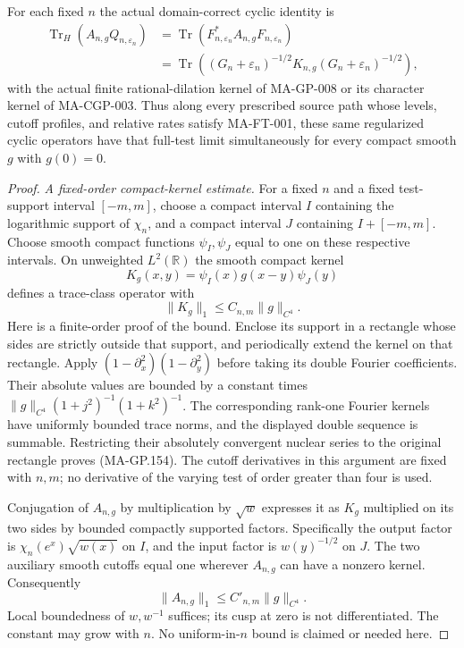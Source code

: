For each fixed $n$ the actual domain-correct cyclic identity is
\[
 \begin{split}
 \operatorname{Tr}_H(A_{n,g}Q_{n,\varepsilon_n})
 &=\operatorname{Tr}
       (F_{n,\varepsilon_n}^*A_{n,g}F_{n,\varepsilon_n})\\
 &=\operatorname{Tr}
       \left((G_n+\varepsilon_n)^{-1/2}
              K_{n,g}(G_n+\varepsilon_n)^{-1/2}\right),
 \end{split}
 \tag{MA-GP.152}
\]
with the actual finite rational-dilation kernel of MA-GP-008
or its character kernel of MA-CGP-003.  Thus along every
prescribed source path whose levels, cutoff profiles, and relative
rates satisfy MA-FT-001, these same regularized cyclic
operators have that full-test limit simultaneously
for every compact smooth $g$ with $g(0)=0$.

\begin{proof}
\emph{A fixed-order compact-kernel estimate.}
For a fixed $n$ and a fixed test-support interval $[-m,m]$,
choose a compact interval $I$ containing the logarithmic
support of $\chi_n$, and a compact interval $J$ containing
$I+[-m,m]$.  Choose smooth compact functions $\psi_I,\psi_J$
equal to one on these respective intervals.  On unweighted
$L^2(\mathbb R)$ the smooth compact kernel
\[
             K_g(x,y)=\psi_I(x)g(x-y)\psi_J(y)
 \tag{MA-GP.153}
\]
defines a trace-class operator with
\[
                       \|K_g\|_1\le C_{n,m}\|g\|_{C^4}.
 \tag{MA-GP.154}
\]
Here is a finite-order proof of the bound.  Enclose its support
in a rectangle whose sides are strictly outside that support,
and periodically extend the kernel on that rectangle.
Apply $(1-\partial_x^2)(1-\partial_y^2)$ before taking its
double Fourier coefficients.  Their absolute values are bounded
by a constant times
$\|g\|_{C^4}(1+j^2)^{-1}(1+k^2)^{-1}$.
The corresponding rank-one Fourier kernels have uniformly
bounded trace norms, and the displayed double sequence is
summable.  Restricting their absolutely convergent nuclear
series to the original rectangle proves (MA-GP.154).
The cutoff derivatives in this argument are fixed with $n,m$;
no derivative of the varying test of order greater than four
is used.

Conjugation of $A_{n,g}$ by multiplication by $\sqrt w$
expresses it as $K_g$ multiplied on its two sides by
bounded compactly supported factors.  Specifically the
output factor is $\chi_n(e^x)\sqrt{w(x)}$ on $I$, and
the input factor is $w(y)^{-1/2}$ on $J$.
The two auxiliary smooth cutoffs equal one wherever
$A_{n,g}$ can have a nonzero kernel.  Consequently
\[
                       \|A_{n,g}\|_1\le C'_{n,m}\|g\|_{C^4}.
 \tag{MA-GP.155}
\]
Local boundedness of $w,w^{-1}$ suffices; its cusp at zero
is not differentiated.  The constant may grow with $n$.
No uniform-in-$n$ bound is claimed or needed here.


\end{proof}

